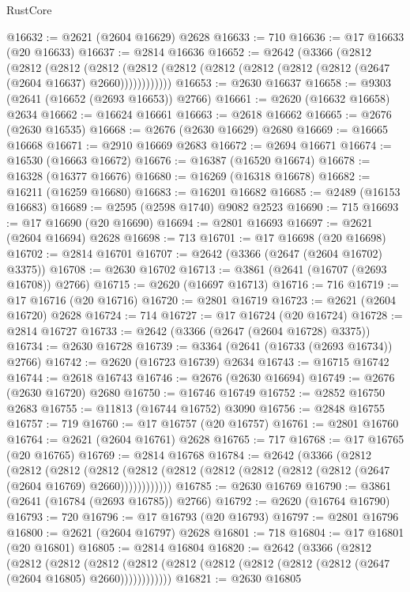 \begin{lexlean}{RustCore}
\begin{coremodule}
@16632 := @2621 (@2604 @16629) @2628
@16633 := 710
@16636 := @17 @16633 (@20 @16633)
@16637 := @2814 @16636
@16652 := @2642
    (@3366
      (@2812
        (@2812
          (@2812
            (@2812 (@2812 (@2812 (@2812 (@2812 (@2812 (@2812 (@2647 (@2604 @16637) @2660))))))))))))
@16653 := @2630 @16637
@16658 := @9303 (@2641 (@16652 (@2693 @16653)) @2766)
@16661 := @2620 (@16632 @16658) @2634
@16662 := @16624 @16661
@16663 := @2618 @16662
@16665 := @2676 (@2630 @16535)
@16668 := @2676 (@2630 @16629) @2680
@16669 := @16665 @16668
@16671 := @2910 @16669 @2683
@16672 := @2694 @16671
@16674 := @16530 (@16663 @16672)
@16676 := @16387 (@16520 @16674)
@16678 := @16328 (@16377 @16676)
@16680 := @16269 (@16318 @16678)
@16682 := @16211 (@16259 @16680)
@16683 := @16201 @16682
@16685 := @2489 (@16153 @16683)
@16689 := @2595 (@2598 @1740) @9082 @2523
@16690 := 715
@16693 := @17 @16690 (@20 @16690)
@16694 := @2801 @16693
@16697 := @2621 (@2604 @16694) @2628
@16698 := 713
@16701 := @17 @16698 (@20 @16698)
@16702 := @2814 @16701
@16707 := @2642 (@3366 (@2647 (@2604 @16702) @3375))
@16708 := @2630 @16702
@16713 := @3861 (@2641 (@16707 (@2693 @16708)) @2766)
@16715 := @2620 (@16697 @16713)
@16716 := 716
@16719 := @17 @16716 (@20 @16716)
@16720 := @2801 @16719
@16723 := @2621 (@2604 @16720) @2628
@16724 := 714
@16727 := @17 @16724 (@20 @16724)
@16728 := @2814 @16727
@16733 := @2642 (@3366 (@2647 (@2604 @16728) @3375))
@16734 := @2630 @16728
@16739 := @3364 (@2641 (@16733 (@2693 @16734)) @2766)
@16742 := @2620 (@16723 @16739) @2634
@16743 := @16715 @16742
@16744 := @2618 @16743
@16746 := @2676 (@2630 @16694)
@16749 := @2676 (@2630 @16720) @2680
@16750 := @16746 @16749
@16752 := @2852 @16750 @2683
@16755 := @11813 (@16744 @16752) @3090
@16756 := @2848 @16755
@16757 := 719
@16760 := @17 @16757 (@20 @16757)
@16761 := @2801 @16760
@16764 := @2621 (@2604 @16761) @2628
@16765 := 717
@16768 := @17 @16765 (@20 @16765)
@16769 := @2814 @16768
@16784 := @2642
    (@3366
      (@2812
        (@2812
          (@2812
            (@2812 (@2812 (@2812 (@2812 (@2812 (@2812 (@2812 (@2647 (@2604 @16769) @2660))))))))))))
@16785 := @2630 @16769
@16790 := @3861 (@2641 (@16784 (@2693 @16785)) @2766)
@16792 := @2620 (@16764 @16790)
@16793 := 720
@16796 := @17 @16793 (@20 @16793)
@16797 := @2801 @16796
@16800 := @2621 (@2604 @16797) @2628
@16801 := 718
@16804 := @17 @16801 (@20 @16801)
@16805 := @2814 @16804
@16820 := @2642
    (@3366
      (@2812
        (@2812
          (@2812
            (@2812 (@2812 (@2812 (@2812 (@2812 (@2812 (@2812 (@2647 (@2604 @16805) @2660))))))))))))
@16821 := @2630 @16805

\end{coremodule}
\end{lexlean}
